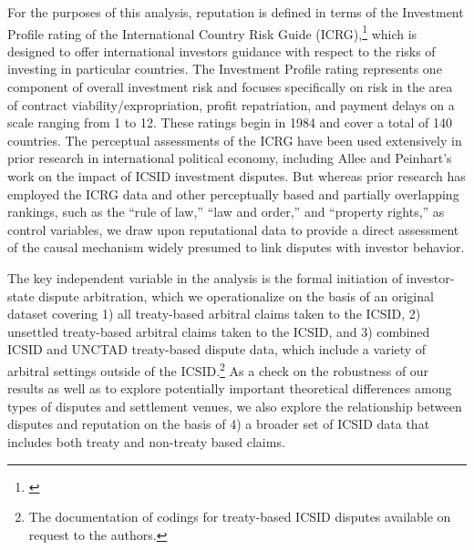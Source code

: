 \documentclass[12pt,onesided]{amsart}
\begin{document}
For the purposes of this analysis, reputation is defined in terms of the Investment Profile rating of the International Country Risk Guide (ICRG),\footnote{\citet{prs:2013}} which is designed to offer international investors guidance with respect to the risks of investing in particular countries. The Investment Profile rating represents one component of overall investment risk and focuses specifically on risk in the area of contract viability/expropriation, profit repatriation, and payment delays on a scale ranging from 1 to 12. These ratings begin in 1984 and cover a total of 140 countries. The perceptual assessments of the ICRG have been used extensively in prior research in international political economy, including Allee and Peinhart's work on the impact of ICSID investment disputes. But whereas prior research has employed the ICRG data and other perceptually based and partially overlapping rankings, such as the ``rule of law,'' ``law and order,'' and ``property rights,'' as control variables, we draw upon reputational data to provide a direct assessment of the causal mechanism widely presumed to link disputes with investor behavior.


The key independent variable in the analysis is the formal initiation of investor-state dispute arbitration, which we operationalize on the basis of an original dataset covering 1) all treaty-based arbitral claims taken to the ICSID, 2) unsettled treaty-based arbitral claims taken to the ICSID, and 3) combined ICSID and UNCTAD treaty-based dispute data, which include a variety of arbitral settings outside of the ICSID.\footnote{The documentation of codings for treaty-based ICSID disputes available on request to the authors.} As a check on the robustness of our results as well as to explore potentially important theoretical differences among types of disputes and settlement venues, we also explore the relationship between disputes and reputation on the basis of 4) a broader set of ICSID data that includes both treaty and non-treaty based claims.
\end{document}

